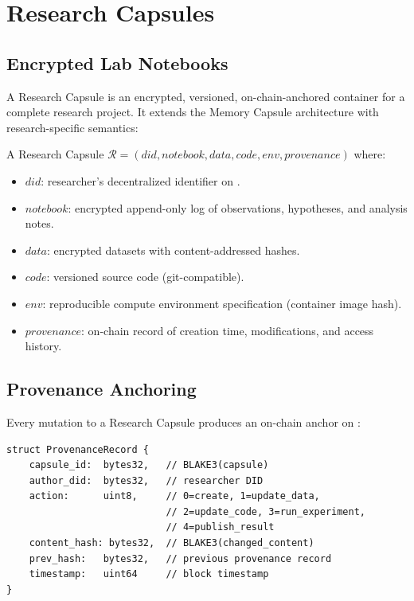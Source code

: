 \section{Research Capsules}

\label{sec:capsules}

\subsection{Encrypted Lab Notebooks}

A Research Capsule is an encrypted, versioned, on-chain-anchored container for a complete research project. It extends the Memory Capsule architecture \cite{zoo-ai-memory} with research-specific semantics:

\begin{definition}
A Research Capsule $\mathcal{R} = (\textit{did}, \textit{notebook}, \textit{data}, \textit{code}, \textit{env}, \textit{provenance})$ where:
\begin{itemize}
    \item $\textit{did}$: researcher's decentralized identifier on \IChain{}.
    \item $\textit{notebook}$: encrypted append-only log of observations, hypotheses, and analysis notes.
    \item $\textit{data}$: encrypted datasets with content-addressed hashes.
    \item $\textit{code}$: versioned source code (git-compatible).
    \item $\textit{env}$: reproducible compute environment specification (container image hash).
    \item $\textit{provenance}$: on-chain record of creation time, modifications, and access history.
\end{itemize}
\end{definition}

\subsection{Provenance Anchoring}

Every mutation to a Research Capsule produces an on-chain anchor on \IChain{}:

\begin{verbatim}
struct ProvenanceRecord {
    capsule_id:  bytes32,   // BLAKE3(capsule)
    author_did:  bytes32,   // researcher DID
    action:      uint8,     // 0=create, 1=update_data,
                            // 2=update_code, 3=run_experiment,
                            // 4=publish_result
    content_hash: bytes32,  // BLAKE3(changed_content)
    prev_hash:   bytes32,   // previous provenance record
    timestamp:   uint64     // block timestamp
}
\end{verbatim}

